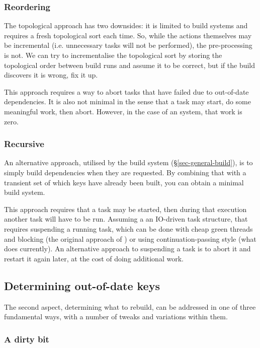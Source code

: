 \subsubsection{Reordering}\label{sec-reordering}

The topological approach has two downsides: it is limited to 
build systems and requires a fresh topological sort each time.  So, while the
actions themselves may be incremental (i.e. unnecessary tasks will not be performed),
the pre-processing is not. We can try to incrementalise the topological sort by
storing the topological order between build runs and assume it to
be correct, but if the build discovers it is wrong, fix it up.

This approach requires a way to abort tasks that have failed due to out-of-date
dependencies. It is also not minimal in the sense that a task may start, do some
meaningful work, then abort. However, in the case of an  system,
that work is zero.

\subsubsection{Recursive}\label{sec-recursive}

An alternative approach, utilised by the  build system
(\S\ref{sec-general-build}), is to simply build dependencies when they are
requested. By combining that with a transient set of which keys have already
been built, you can obtain a minimal build system.

This approach requires that a task may be started, then during that execution
another task will have to be run. Assuming a an IO-driven task structure,
that requires suspending a running task, which can be done with cheap
green threads and blocking (the original approach of \Shake) or using
continuation-passing style (what \Shake does currently). An alternative approach to
suspending a task is to abort it and restart it again later, at the cost
of doing additional work.

\subsection{Determining out-of-date keys} \label{sec-out-of-date}

The second aspect, determining what to rebuild, can be addressed in one of three
fundamental ways, with a number of tweaks and variations within them.

\subsubsection{A dirty bit}\label{sec-dirty-bit}

